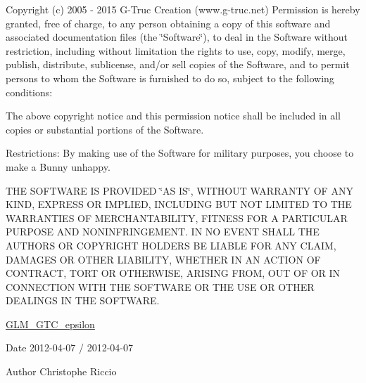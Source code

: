 Copyright (c) 2005 -\/ 2015 G-\/\-Truc Creation (www.\-g-\/truc.\-net) Permission is hereby granted, free of charge, to any person obtaining a copy of this software and associated documentation files (the \char`\"{}\-Software\char`\"{}), to deal in the Software without restriction, including without limitation the rights to use, copy, modify, merge, publish, distribute, sublicense, and/or sell copies of the Software, and to permit persons to whom the Software is furnished to do so, subject to the following conditions\-:

The above copyright notice and this permission notice shall be included in all copies or substantial portions of the Software.

Restrictions\-: By making use of the Software for military purposes, you choose to make a Bunny unhappy.

T\-H\-E S\-O\-F\-T\-W\-A\-R\-E I\-S P\-R\-O\-V\-I\-D\-E\-D \char`\"{}\-A\-S I\-S\char`\"{}, W\-I\-T\-H\-O\-U\-T W\-A\-R\-R\-A\-N\-T\-Y O\-F A\-N\-Y K\-I\-N\-D, E\-X\-P\-R\-E\-S\-S O\-R I\-M\-P\-L\-I\-E\-D, I\-N\-C\-L\-U\-D\-I\-N\-G B\-U\-T N\-O\-T L\-I\-M\-I\-T\-E\-D T\-O T\-H\-E W\-A\-R\-R\-A\-N\-T\-I\-E\-S O\-F M\-E\-R\-C\-H\-A\-N\-T\-A\-B\-I\-L\-I\-T\-Y, F\-I\-T\-N\-E\-S\-S F\-O\-R A P\-A\-R\-T\-I\-C\-U\-L\-A\-R P\-U\-R\-P\-O\-S\-E A\-N\-D N\-O\-N\-I\-N\-F\-R\-I\-N\-G\-E\-M\-E\-N\-T. I\-N N\-O E\-V\-E\-N\-T S\-H\-A\-L\-L T\-H\-E A\-U\-T\-H\-O\-R\-S O\-R C\-O\-P\-Y\-R\-I\-G\-H\-T H\-O\-L\-D\-E\-R\-S B\-E L\-I\-A\-B\-L\-E F\-O\-R A\-N\-Y C\-L\-A\-I\-M, D\-A\-M\-A\-G\-E\-S O\-R O\-T\-H\-E\-R L\-I\-A\-B\-I\-L\-I\-T\-Y, W\-H\-E\-T\-H\-E\-R I\-N A\-N A\-C\-T\-I\-O\-N O\-F C\-O\-N\-T\-R\-A\-C\-T, T\-O\-R\-T O\-R O\-T\-H\-E\-R\-W\-I\-S\-E, A\-R\-I\-S\-I\-N\-G F\-R\-O\-M, O\-U\-T O\-F O\-R I\-N C\-O\-N\-N\-E\-C\-T\-I\-O\-N W\-I\-T\-H T\-H\-E S\-O\-F\-T\-W\-A\-R\-E O\-R T\-H\-E U\-S\-E O\-R O\-T\-H\-E\-R D\-E\-A\-L\-I\-N\-G\-S I\-N T\-H\-E S\-O\-F\-T\-W\-A\-R\-E.

\hyperlink{group__gtc__epsilon}{G\-L\-M\-\_\-\-G\-T\-C\-\_\-epsilon}

\begin{DoxyDate}{Date}
2012-\/04-\/07 / 2012-\/04-\/07 
\end{DoxyDate}
\begin{DoxyAuthor}{Author}
Christophe Riccio 
\end{DoxyAuthor}
